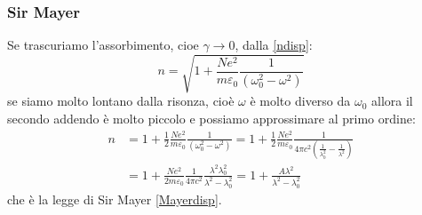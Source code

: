 \subsubsection{Sir Mayer}
Se trascuriamo l'assorbimento, cioe $\gamma\to 0$, dalla \eqref{ndisp}:
\begin{equation}
  n=\sqrt{1+\frac{Ne^2}{m\varepsilon_0}\frac{1}{(\omega_0^2-\omega^2)}}
\end{equation}
se siamo molto lontano dalla risonza, cioè $\omega$ è molto diverso da $\omega_0$ allora il secondo addendo è molto piccolo e possiamo approssimare al primo ordine:
\begin{equation}
  \begin{split}
    n&=1+\frac{1}{2}\frac{Ne^2}{m\varepsilon_0}\frac{1}{(\omega_0^2-\omega^2)}=1+\frac{1}{2}\frac{Ne^2}{m\varepsilon_0}\frac{1}{4\pi c^2\left(\frac{1}{\lambda_0^2}-\frac{1}{\lambda^2}\right)}\\
    &=1+\frac{Ne^2}{2m\varepsilon_0}\frac{1}{4\pi c^2}\frac{\lambda^2\lambda_0^2}{\lambda^2-\lambda_0^2}=1+\frac{A\lambda^2}{\lambda^2-\lambda_0^2}
  \end{split}
\end{equation}
che è la legge di Sir Mayer \eqref{Mayerdisp}.

